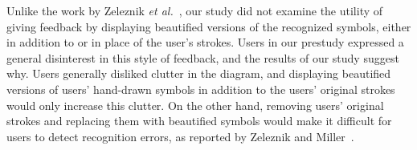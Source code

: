 \documentclass{elsart}
\begin{document}
Unlike the work by Zeleznik \textit{et al.}~\cite{Zeleznik2007Designing},
our study did not examine the utility of giving feedback by
displaying beautified versions of the recognized symbols, either in
addition to or in place of the user's strokes.  Users in our prestudy
expressed a general disinterest in this style of feedback, and the
results of our study suggest why.  Users generally disliked clutter in
the diagram, and displaying beautified versions of users' hand-drawn
symbols in addition to the users' original strokes would only increase
this clutter.  On the other hand, removing users' original strokes and
replacing them with beautified symbols would make it difficult for
users to detect recognition errors, as reported by Zeleznik and
Miller~\cite{Zeleznik2007Designing}.



\end{document}
